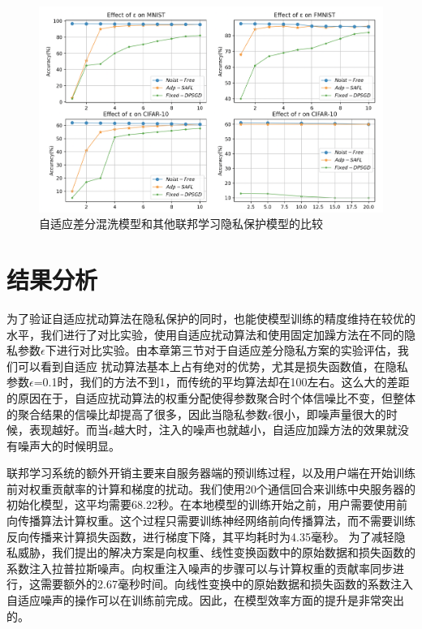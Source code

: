 \begin{figure}[!hbt]
\centering
  	\includegraphics[scale=0.4]{fig2/C5/SA-FL对比实验}%
	\caption{自适应差分混洗模型和其他联邦学习隐私保护模型的比较}
  	\label{自适应差分混洗模型和其他联邦学习隐私保护模型的比较} 
\end{figure}

\section{结果分析}
为了验证自适应扰动算法在隐私保护的同时，也能使模型训练的精度维持在较优的水平，我们进行了对比实验，使用自适应扰动算法和使用固定加躁方法在不同的隐私参数$\epsilon$下进行对比实验。由本章第三节对于自适应差分隐私方案的实验评估，我们可以看到自适应
扰动算法基本上占有绝对的优势，尤其是损失函数值，在隐私参数$\epsilon$=0.1时，我们的方法不到1，而传统的平均算法却在100左右。这么大的差距的原因在于，自适应扰动算法的权重分配使得参数聚合时个体信噪比不变，但整体的聚合结果的信噪比却提高了很多，因此当隐私参数$\epsilon$很小，即噪声量很大的时候，表现越好。而当$\epsilon$越大时，注入的噪声也就越小，自适应加躁方法的效果就没有噪声大的时候明显。

联邦学习系统的额外开销主要来自服务器端的预训练过程，以及用户端在开始训练前对权重贡献率的计算和梯度的扰动。我们使用20个通信回合来训练中央服务器的初始化模型，这平均需要68.22秒。在本地模型的训练开始之前，用户需要使用前向传播算法计算权重。这个过程只需要训练神经网络前向传播算法，而不需要训练反向传播来计算损失函数，进行梯度下降，其平均耗时为4.35毫秒。
为了减轻隐私威胁，我们提出的解决方案是向权重、线性变换函数中的原始数据和损失函数的系数注入拉普拉斯噪声。向权重注入噪声的步骤可以与计算权重的贡献率同步进行，这需要额外的2.67毫秒时间。向线性变换中的原始数据和损失函数的系数注入自适应噪声的操作可以在训练前完成。因此，在模型效率方面的提升是非常突出的。

